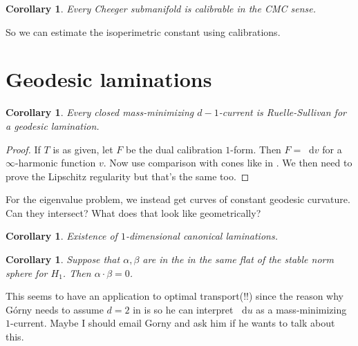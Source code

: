\documentclass[reqno,11pt]{amsart}
\newcommand*\dif{\mathop{}\!\mathrm{d}}
\newtheorem{corollary}[theorem]{Corollary}
\theoremstyle{definition}
\numberwithin{equation}{section}
\begin{document}
\begin{corollary}
Every Cheeger submanifold is calibrable in the CMC sense.
\end{corollary}

So we can estimate the isoperimetric constant using calibrations.

\section{Geodesic laminations}
\begin{corollary}
    Every closed mass-minimizing $d - 1$-current is Ruelle-Sullivan for a geodesic lamination.
\end{corollary}
\begin{proof}
If $T$ is as given, let $F$ be the dual calibration $1$-form.
Then $F = \dif v$ for a $\infty$-harmonic function $v$.
Now use comparison with cones like in \cite{daskalopoulos2020transverse}.
We then need to prove the Lipschitz regularity but that's the same too.
\end{proof}

For the eigenvalue problem, we instead get curves of constant geodesic curvature. 
Can they intersect? What does that look like geometrically?

\begin{corollary}
Existence of $1$-dimensional canonical laminations.
\end{corollary}

\begin{corollary}
Suppose that $\alpha, \beta$ are in the in the same flat of the stable norm sphere for $H_1$.
Then $\alpha \cdot \beta = 0$.
\end{corollary}

This seems to have an application to optimal transport(!!) since the reason why G\'orny needs to assume $d = 2$ in \cite{górny2021applications} is so he can interpret $\dif u$ as a mass-minimizing $1$-current.
Maybe I should email Gorny and ask him if he wants to talk about this.

\printbibliography
\end{document}
